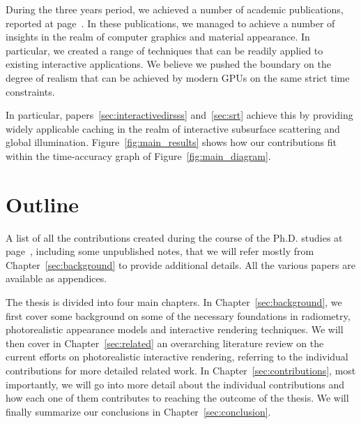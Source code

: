 During the three years period, we achieved a number of academic publications, reported at page~\pageref{sec:contributionlist}. In these publications, we managed to achieve a number of insights in the realm of computer graphics and material appearance. In particular, we created a range of techniques that can be readily applied to existing interactive applications. We believe we pushed the boundary on the degree of realism that can be achieved by modern GPUs on the same strict time constraints. 

In particular, papers~\ref{sec:interactivedirsss} and~\ref{sec:srt} achieve this by providing widely applicable caching in the realm of interactive subsurface scattering and global illumination. Figure~\ref{fig:main_results} shows how our contributions fit within the time-accuracy graph of Figure~\ref{fig:main_diagram}.

\section{Outline}
A list of all the contributions created during the course of the Ph.D. studies at page~\pageref{sec:contributionlist}, including some unpublished notes, that we will refer mostly from Chapter~\ref{sec:background} to provide additional details. All the various papers are available as appendices. 

The thesis is divided into four main chapters. In Chapter~\ref{sec:background}, we first cover some background on some of the necessary foundations in radiometry, photorealistic appearance models and interactive rendering techniques. We will then cover in Chapter~\ref{sec:related} an overarching literature review on the current efforts on photorealistic interactive rendering, referring to the individual contributions for more detailed related work. In Chapter~\ref{sec:contributions}, most importantly, we will go into more detail about the individual contributions and how each one of them contributes to reaching the outcome of the thesis. We will finally summarize our conclusions in Chapter~\ref{sec:conclusion}. 
